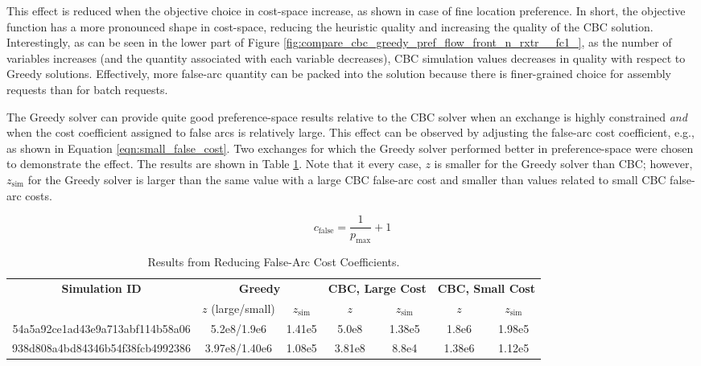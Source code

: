 This effect is reduced when the objective choice in cost-space increase, as
shown in case of fine location preference. In short, the objective function has
a more pronounced shape in cost-space, reducing the heuristic quality and
increasing the quality of the CBC solution. Interestingly, as can be seen in the
lower part of Figure \ref{fig:compare_cbc_greedy_pref_flow_front_n_rxtr__fc1_},
as the number of variables increases (and the quantity associated with each
variable decreases), CBC simulation values decreases in quality with respect to
Greedy solutions. Effectively, more false-arc quantity can be packed into the
solution because there is finer-grained choice for assembly requests than for
batch requests.

The Greedy solver can provide quite good preference-space results relative to
the CBC solver when an exchange is highly constrained \textit{and} when the cost
coefficient assigned to false arcs is relatively large. This effect can be
observed by adjusting the false-arc cost coefficient, e.g., as shown in Equation
\ref{eqn:small_false_cost}. Two exchanges for which the Greedy solver performed
better in preference-space were chosen to demonstrate the effect. The results
are shown in Table \ref{tbl:false_arcs}. Note that it every case, $z$ is smaller
for the Greedy solver than CBC; however, $z_\text{sim}$ for the Greedy solver is
larger than the same value with a large CBC false-arc cost and smaller than
values related to small CBC false-arc costs.

\begin{equation}\label{eqn:small_false_cost}
c_\text{false} = \frac{1}{p_\text{max}} + 1
\end{equation}

\begin{table}[h!]
\centering
\caption{Results from Reducing False-Arc Cost Coefficients.}
\label{tbl:false_arcs}
\begin{tabular}{|c|c|c|c|c|c|c|}
\hline
\multirow{2}{*}{\textbf{Simulation ID}} 
& \multicolumn{2}{c|}{\textbf{Greedy}} 
& \multicolumn{2}{c|}{\textbf{CBC, Large Cost}} 
& \multicolumn{2}{c|}{\textbf{CBC, Small Cost}} \\ \cline{2-7} 
& $z$ (large/small)        & $z_{\text{sim}}$        
& $z$             & $z_{\text{sim}}$            
& $z$             & $z_{\text{sim}}$            \\ \hline
54a5a92ce1ad43e9a713abf114b58a06
& 5.2e8/1.9e6 & 1.41e5
& 5.0e8 & 1.38e5
& 1.8e6 & 1.98e5 \\ \hline
938d808a4bd84346b54f38fcb4992386
& 3.97e8/1.40e6 & 1.08e5
& 3.81e8 & 8.8e4
& 1.38e6 & 1.12e5 \\ \hline
\end{tabular}
\end{table}

